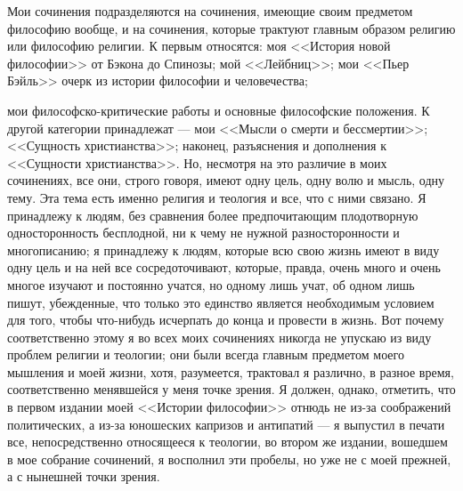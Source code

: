 \documentclass[12pt]{article}
\begin{document}
Мои сочинения подразделяются на сочинения, имеющие своим предметом философию вообще, и на сочинения, которые трактуют главным образом религию или философию религии. К первым относятся: моя <<История новой философии>> от Бэкона до Спинозы; мой <<Лейбниц>>; мои <<Пьер Бэйль>>  очерк из истории философии и человечества; 

мои философско-критические работы и основные философские положения. К другой категории принадлежат --- мои <<Мысли о смерти и бессмертии>>; <<Сущность христианства>>; наконец, разъяснения и дополнения к <<Сущности христианства>>. Но, несмотря на это различие в моих сочинениях, все они, строго говоря, имеют одну цель, одну волю и мысль, одну тему. Эта тема есть именно религия и теология и все, что с ними связано. Я принадлежу к людям, без сравнения более предпочитающим плодотворную односторонность бесплодной, ни к чему не нужной разносторонности и многописанию; я принадлежу к людям, которые всю свою жизнь имеют в виду одну цель и на ней все сосредоточивают, которые, правда, очень много и очень многое изучают и постоянно учатся, но одному лишь учат, об одном лишь пишут, убежденные, что только это единство является необходимым условием для того, чтобы что-нибудь исчерпать до конца и провести в жизнь. Вот почему соответственно этому я во всех моих сочинениях никогда не упускаю из виду проблем религии и теологии; они были всегда главным предметом моего мышления и моей жизни, хотя, разумеется, трактовал я различно, в разное время, соответственно менявшейся у меня точке зрения. Я должен, однако, отметить, что в первом издании моей <<Истории философии>> отнюдь не из-за соображений политических, а из-за юношеских капризов и антипатий --- я выпустил в печати все, непосредственно относящееся к теологии, во втором же издании, вошедшем в мое собрание сочинений, я восполнил эти пробелы, но уже не с моей прежней, а с нынешней точки зрения. 
\end{document}
